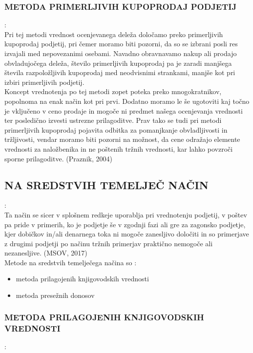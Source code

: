 \documentclass[12pt,a4paper]{amsart}
\theoremstyle{definition} %
\theoremstyle{plain} %
\begin{document}
\subsubsection{METODA PRIMERLJIVIH KUPOPRODAJ PODJETIJ}:\\

Pri tej metodi vrednost ocenjevanega deleža določamo preko primerljivih kupoprodaj podjetij, pri čemer moramo biti pozorni, da so se izbrani posli res izvajali med nepovezanimi osebami. Navadno obravnavamo nakup ali prodajo obvladujočega deleža, število primerljivih kupoprodaj pa je zaradi manjšega števila razpoložljivih kupoprodaj med neodvisnimi strankami, manjše kot pri izbiri primerljivih podjetij.\\
Koncept vrednotenja po tej metodi zopet poteka preko mnogokratnikov, popolnoma na enak način kot pri prvi. Dodatno moramo le še ugotoviti kaj točno je vključeno v ceno prodaje in mogoče ni predmet našega ocenjevanja vrednosti ter posledično izvesti ustrezne prilagoditve. Prav tako se tudi pri metodi primerljivih kupoprodaj pojavita odbitka za pomanjkanje obvladljivosti in tržljivosti, vendar moramo biti pozorni na možnost, da cene odražajo elemente vrednosti za naložbenika in ne poštenih tržnih vrednosti, kar lahko povzroči sporne prilagoditve. (Praznik, 2004)


\subsection{NA SREDSTVIH TEMELJEČ NAČIN}:\\

Ta način se sicer v splošnem redkeje uporablja pri vrednotenju podjetij, v poštev pa pride v primerih, ko je podjetje še v zgodnji fazi ali gre za zagonsko podjetje, kjer dobičkov in/ali denarnega toka ni mogoče zanesljivo določiti in so primerjave z drugimi podjetji po načinu tržnih primerjav praktično nemogoče ali nezanesljive. (MSOV, 2017)\\
Metode na sredstvih temelječega načina so :
\begin{itemize}
\item metoda prilagojenih knjigovodskih vrednosti
\item metoda presežnih donosov
\end{itemize}

\subsubsection{METODA PRILAGOJENIH KNJIGOVODSKIH VREDNOSTI}:\\
\end{document}
